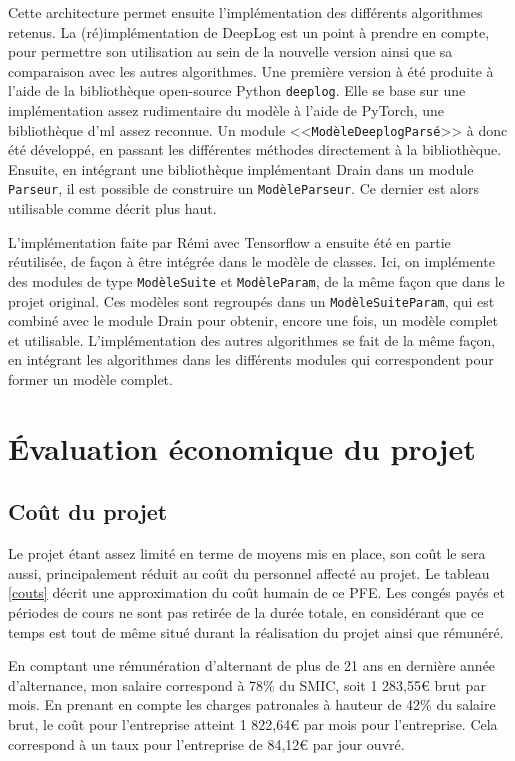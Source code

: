 \documentclass[openany, 11pt]{memoir}
\begin{document}
\bigskip
Cette architecture permet ensuite l'implémentation des différents algorithmes retenus. La (ré)\-implémentation de DeepLog est un point à prendre en compte, pour permettre son utilisation au sein de la nouvelle version ainsi que sa comparaison avec les autres algorithmes. Une première version à été produite à l'aide de la bibliothèque open-source Python \texttt{deeplog}. Elle se base sur une implémentation assez rudimentaire du modèle à l'aide de PyTorch, une bibliothèque d'\gls{ml} assez reconnue. Un module <<\texttt{ModèleDeeplogParsé}>> à donc été développé, en passant les différentes méthodes directement à la bibliothèque. Ensuite, en intégrant une bibliothèque implémentant Drain dans un module \texttt{Parseur}, il est possible de construire un \texttt{ModèleParseur}. Ce dernier est alors utilisable comme décrit plus haut.

L'implémentation faite par Rémi avec Tensorflow a ensuite été en partie réutilisée, de façon à être intégrée dans le modèle de classes. Ici, on implémente des modules de type \texttt{ModèleSuite} et \texttt{ModèleParam}, de la même façon que dans le projet original. Ces modèles sont regroupés dans un \texttt{ModèleSuiteParam}, qui est combiné avec le module Drain pour obtenir, encore une fois, un modèle complet et utilisable. L'implémentation des autres algorithmes se fait de la même façon, en intégrant les algorithmes dans les différents modules qui correspondent pour former un modèle complet.


\newpage
\section{Évaluation économique du projet}

\subsection{Coût du projet}

Le projet étant assez limité en terme de moyens mis en place, son coût le sera aussi, principalement réduit au coût du personnel affecté au projet. Le tableau \ref{couts} décrit une approximation du coût humain de ce PFE. Les congés payés et périodes de cours ne sont pas retirée de la durée totale, en considérant que ce temps est tout de même situé durant la réalisation du projet ainsi que rémunéré.

\bigskip
En comptant une rémunération d'alternant de plus de 21 ans en dernière année d'alternance, mon salaire correspond à 78\% du SMIC, soit 1 283,55€ brut par mois. En prenant en compte les charges patronales à hauteur de 42\% du salaire brut, le coût pour l'entreprise atteint 1 822,64€ par mois pour l'entreprise.  Cela correspond à un taux pour l'entreprise de 84,12€ par jour ouvré.
\end{document}
